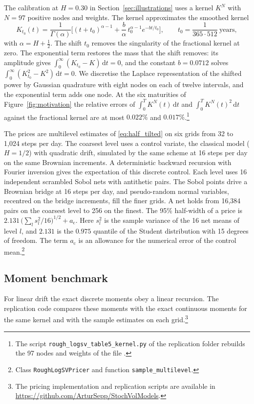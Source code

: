 \documentclass{rQUF2e}
\theoremstyle{plain}
\theoremstyle{definition}
\theoremstyle{remark}
\newcommand{\D}{\mathrm{d}}
\begin{document}
The calibration at $H=0.30$ in Section~\ref{sec:illustrations} uses a kernel $K^N$ with $N=97$ positive nodes and weights. The kernel approximates the smoothed kernel
\begin{equation}\label{eq:kernel_smooth}
K_{t_0}(t)=\frac{1}{\Gamma(\alpha)}\Big[(t+t_0)^{\alpha-1}+\frac{b}{\alpha}\,t_0^{\alpha-1}e^{-bt/t_0}\Big],\qquad t_0=\frac{1}{365\cdot512}\ \text{years},
\end{equation}
with $\alpha=H+\tfrac12$. The shift $t_0$ removes the singularity of the fractional kernel at zero. The exponential term restores the mass that the shift removes: its amplitude gives $\int_0^\infty(K_{t_0}-K)\,\D t=0$, and the constant $b=0.0712$ solves $\int_0^\infty(K_{t_0}^2-K^2)\,\D t=0$. We discretise the Laplace representation of the shifted power by Gaussian quadrature with eight nodes on each of twelve intervals, and the exponential term adds one node. At the six maturities of Figure~\ref{fig:motivation} the relative errors of $\int_0^TK^N(t)\,\D t$ and $\int_0^TK^N(t)^2\,\D t$ against the fractional kernel are at most $0.022\%$ and $0.017\%$.\footnote{The script \texttt{rough\_logsv\_table5\_kernel.py} of the replication folder rebuilds the 97 nodes and weights of the file .}

The prices are multilevel estimates \citep{Giles2008} of \eqref{eq:half_tilted} on six grids from 32 to 1,024 steps per day. The coarsest level uses a control variate, the classical model ($H=1/2$) with quadratic drift, simulated by the same scheme at 16 steps per day on the same Brownian increments. A deterministic backward recursion with Fourier inversion gives the expectation of this discrete control. Each level uses 16 independent scrambled Sobol nets with antithetic pairs. The Sobol points drive a Brownian bridge at 16 steps per day, and pseudo-random normal variables, recentred on the bridge increments, fill the finer grids. A net holds from 16{,}384 pairs on the coarsest level to 256 on the finest. The 95\% half-width of a price is $2.131\,\big(\sum_ls_l^2/16\big)^{1/2}+a_{\mathrm c}$. Here $s_l^2$ is the sample variance of the 16 net means of level $l$, and $2.131$ is the $0.975$ quantile of the Student distribution with 15 degrees of freedom. The term $a_{\mathrm c}$ is an allowance for the numerical error of the control mean.\footnote{Class \texttt{RoughLogSVPricer} and function \texttt{sample\_multilevel}.}

\subsection{Moment benchmark}\label{sec:validation}
For linear drift the exact discrete moments obey a linear recursion. The replication code compares these moments with the exact continuous moments for the same kernel and with the sample estimates on each grid.\footnote{The pricing implementation and replication scripts are available in \url{https://github.com/ArturSepp/StochVolModels}.}
\end{document}
